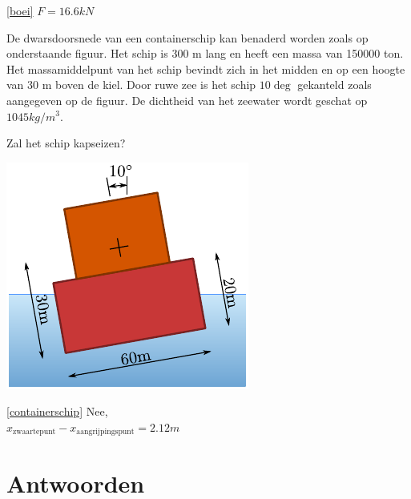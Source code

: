 \begin{antwoord}{\ref{boei}}
	$F = 16.6\unit{kN}$
\end{antwoord}
\begin{toepassing}
	\label{containerschip}
De dwarsdoorsnede van een containerschip kan benaderd worden zoals op onderstaande figuur. Het schip is 300 m lang en heeft een massa van 150000 ton. Het massamiddelpunt van het schip bevindt zich in het midden en op een hoogte van 30 m boven de kiel. Door ruwe zee is het schip $10\deg$ gekanteld zoals aangegeven op de figuur. De dichtheid van het zeewater wordt geschat op $1045\unit{kg/m^3}$.
		
Zal het schip kapseizen?
		
	\centering
	\includegraphics{fig/hydrostatica/containerschip}
\end{toepassing}
\begin{antwoord}{\ref{containerschip}}
	Nee,\\ $x_\text{zwaartepunt}-x_\text{aangrijpingspunt} = 2.12\unit{m}$
\end{antwoord}
	
\section*{Antwoorden}
	\begin{multicols}{2}
	\end{multicols}
